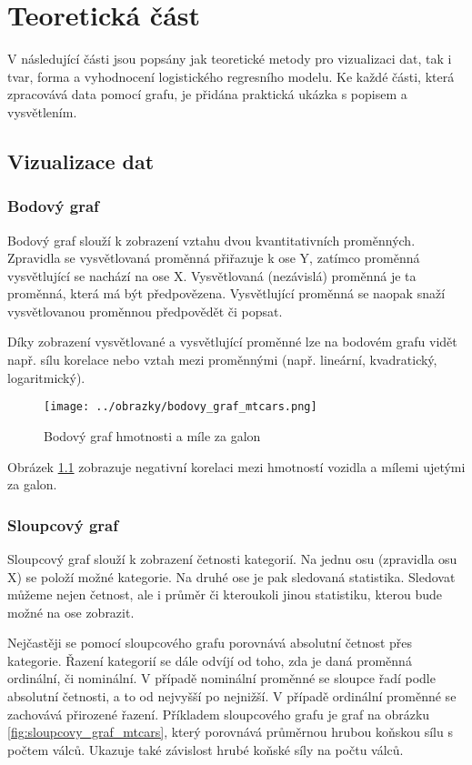 \chapter{Teoretická část}
V následující části jsou popsány jak teoretické metody pro vizualizaci dat, tak i tvar, forma a vyhodnocení logistického regresního modelu. 
Ke každé části, která zpracovává data pomocí grafu, je přidána praktická ukázka s popisem a vysvětlením.

\section{Vizualizace dat} \label{sec:vizualizace_dat}
\subsection{Bodový graf}
Bodový graf slouží k zobrazení vztahu dvou kvantitativních proměnných. Zpravidla se vysvětlovaná proměnná přiřazuje k ose Y,
zatímco proměnná vysvětlující se nachází na ose X. Vysvětlovaná (nezávislá) proměnná je ta proměnná, která má být předpovězena.
Vysvětlující proměnná se naopak snaží vysvětlovanou proměnnou předpovědět či popsat.

Díky zobrazení vysvětlované a vysvětlující proměnné lze na bodovém grafu vidět např. sílu korelace nebo vztah mezi proměnnými (např. lineární, kvadratický, logaritmický).
  
\begin{figure}[H]
    \centering
    \texttt{[image: ../obrazky/bodovy\_graf\_mtcars.png]}
    \caption{Bodový graf hmotnosti a míle za galon} 
    \label{fig:bodovy_graf_mtcars}
\end{figure}

Obrázek \ref{fig:bodovy_graf_mtcars} zobrazuje negativní korelaci mezi hmotností vozidla a mílemi ujetými za galon.

\subsection{Sloupcový graf}
Sloupcový graf slouží k zobrazení četnosti
kategorií. Na jednu osu (zpravidla osu X) se položí možné kategorie. Na druhé ose je pak sledovaná statistika.
Sledovat můžeme nejen četnost, ale i průměr či kteroukoli jinou statistiku, kterou bude možné na ose zobrazit.

Nejčastěji se pomocí sloupcového grafu porovnává absolutní četnost přes kategorie. Řazení kategorií se dále odvíjí od toho, zda je
daná proměnná ordinální, či nominální. V případě nominální proměnné se sloupce řadí podle absolutní četnosti, a to od nejvyšší po nejnižší.
V případě ordinální proměnné se zachovává přirozené řazení. Příkladem sloupcového grafu je graf na obrázku \ref{fig:sloupcovy_graf_mtcars}, který porovnává průměrnou hrubou
koňskou sílu s počtem válců. Ukazuje také závislost hrubé koňské síly na počtu válců.

